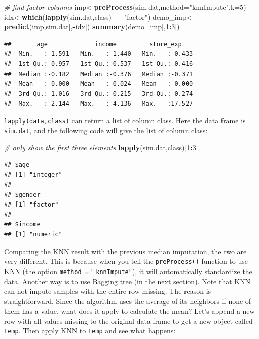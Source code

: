 \documentclass[12pt,]{krantz}
\newenvironment{Shaded}{\begin{snugshade}}{\end{snugshade}}
\newcommand{\KeywordTok}[1]{\textcolor[rgb]{0.13,0.29,0.53}{\textbf{#1}}}
\newcommand{\DataTypeTok}[1]{\textcolor[rgb]{0.13,0.29,0.53}{#1}}
\newcommand{\DecValTok}[1]{\textcolor[rgb]{0.00,0.00,0.81}{#1}}
\newcommand{\StringTok}[1]{\textcolor[rgb]{0.31,0.60,0.02}{#1}}
\newcommand{\CommentTok}[1]{\textcolor[rgb]{0.56,0.35,0.01}{\textit{#1}}}
\newcommand{\OperatorTok}[1]{\textcolor[rgb]{0.81,0.36,0.00}{\textbf{#1}}}
\newcommand{\NormalTok}[1]{#1}
\theoremstyle{definition}
\theoremstyle{definition}
\theoremstyle{definition}
\theoremstyle{remark}
\begin{document}
\begin{Shaded}
\begin{Highlighting}[]
\CommentTok{# find factor columns}
\NormalTok{imp<-}\KeywordTok{preProcess}\NormalTok{(sim.dat,}\DataTypeTok{method=}\StringTok{"knnImpute"}\NormalTok{,}\DataTypeTok{k=}\DecValTok{5}\NormalTok{)}
\NormalTok{idx<-}\KeywordTok{which}\NormalTok{(}\KeywordTok{lapply}\NormalTok{(sim.dat,class)}\OperatorTok{==}\StringTok{"factor"}\NormalTok{)}
\NormalTok{demo_imp<-}\KeywordTok{predict}\NormalTok{(imp,sim.dat[,}\OperatorTok{-}\NormalTok{idx])}
\KeywordTok{summary}\NormalTok{(demo_imp[,}\DecValTok{1}\OperatorTok{:}\DecValTok{3}\NormalTok{])}
\end{Highlighting}
\end{Shaded}

\begin{verbatim}
##       age             income         store_exp     
##  Min.   :-1.591   Min.   :-1.440   Min.   :-0.433  
##  1st Qu.:-0.957   1st Qu.:-0.537   1st Qu.:-0.416  
##  Median :-0.182   Median :-0.376   Median :-0.371  
##  Mean   : 0.000   Mean   : 0.024   Mean   : 0.000  
##  3rd Qu.: 1.016   3rd Qu.: 0.215   3rd Qu.:-0.274  
##  Max.   : 2.144   Max.   : 4.136   Max.   :17.527
\end{verbatim}

\texttt{lapply(data,class)} can return a list of column class. Here the
data frame is \texttt{sim.dat}, and the following code will give the
list of column class:

\begin{Shaded}
\begin{Highlighting}[]
\CommentTok{# only show the first three elements}
\KeywordTok{lapply}\NormalTok{(sim.dat,class)[}\DecValTok{1}\OperatorTok{:}\DecValTok{3}\NormalTok{]}
\end{Highlighting}
\end{Shaded}

\begin{verbatim}
## $age
## [1] "integer"
## 
## $gender
## [1] "factor"
## 
## $income
## [1] "numeric"
\end{verbatim}

Comparing the KNN result with the previous median imputation, the two
are very different. This is because when you tell the
\texttt{preProcess()} function to use KNN (the option
\texttt{method\ ="\ knnImpute"}), it will automatically standardize the
data. Another way is to use Bagging tree (in the next section). Note
that KNN can not impute samples with the entire row missing. The reason
is straightforward. Since the algorithm uses the average of its
neighbors if none of them has a value, what does it apply to calculate
the mean? Let's append a new row with all values missing to the original
data frame to get a new object called \texttt{temp}. Then apply KNN to
\texttt{temp} and see what happens:
\end{document}
